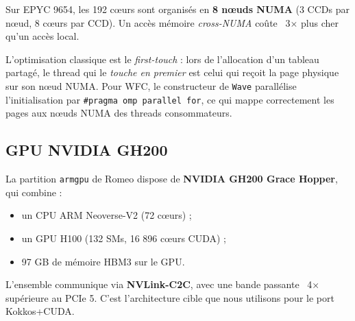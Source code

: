 Sur EPYC 9654, les 192 cœurs sont organisés en \textbf{8 nœuds NUMA} (3 CCDs par nœud, 8 cœurs par CCD). Un accès mémoire \textit{cross-NUMA} coûte ~3× plus cher qu'un accès local.

L'optimisation classique est le \textit{first-touch} : lors de l'allocation d'un tableau partagé, le thread qui le \textit{touche en premier} est celui qui reçoit la page physique sur son nœud NUMA. Pour WFC, le constructeur de \texttt{Wave} parallélise l'initialisation par \texttt{\#pragma omp parallel for}, ce qui mappe correctement les pages aux nœuds NUMA des threads consommateurs.

\subsection{GPU NVIDIA GH200}

La partition \texttt{armgpu} de Romeo dispose de \textbf{NVIDIA GH200 Grace Hopper}, qui combine :
\begin{itemize}
    \item un CPU ARM Neoverse-V2 (72 cœurs) ;
    \item un GPU H100 (132 SMs, 16 896 cœurs CUDA) ;
    \item 97 GB de mémoire HBM3 sur le GPU.
\end{itemize}

L'ensemble communique via \textbf{NVLink-C2C}, avec une bande passante ~4× supérieure au PCIe 5. C'est l'architecture cible que nous utilisons pour le port Kokkos+CUDA.
